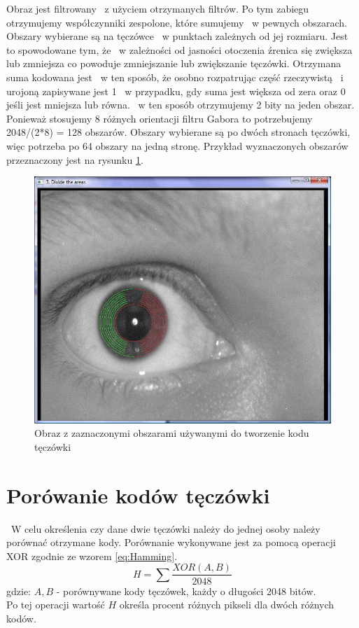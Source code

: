 Obraz jest filtrowany ~z użyciem otrzymanych filtrów. Po tym zabiegu otrzymujemy współczynniki zespolone, które sumujemy ~w pewnych obszarach. Obszary wybierane są na tęczówce ~w punktach zależnych od jej rozmiaru. Jest to spowodowane tym, że ~w zależności od jasności otoczenia źrenica się zwiększa lub zmniejsza co powoduje zmniejszanie lub zwiększanie tęczówki. Otrzymana suma kodowana jest ~w ten sposób, że osobno rozpatrując część rzeczywistą ~i urojoną zapisywane jest 1 ~w przypadku, gdy suma jest większa od zera oraz 0 jeśli jest mniejsza lub równa. ~w ten sposób otrzymujemy 2 bity na jeden obszar. Ponieważ stosujemy 8 różnych orientacji filtru Gabora to potrzebujemy 2048/(2*8) = 128 obszarów. Obszary wybierane są po dwóch stronach tęczówki, więc potrzeba po 64 obszary na jedną stronę. Przykład wyznaczonych obszarów przeznaczony jest na rysunku \ref{fig:obszaryNasze}.

\begin{figure}
\label{fig:obszaryNasze}
\begin{center}
\includegraphics[scale=0.5]{obszary.jpg}
\caption{Obraz z zaznaczonymi obszarami używanymi do tworzenie kodu tęczówki}
\end{center}
\end{figure}

\section{Porówanie kodów tęczówki}
\label{sec:porownanieKodow}
~W celu określenia czy dane dwie tęczówki należy do jednej osoby należy porównać otrzymane kody. Porównanie wykonywane jest za pomocą operacji XOR zgodnie ze wzorem \ref{eq:Hamming}.
\begin{equation}
\label{eq:Hamming}
H = \sum \frac{XOR(A,B)}{2048}
\end{equation}
gdzie:
$A, B$ - porównywane kody tęczówek, każdy o długości 2048 bitów.\\
Po tej operacji wartość $H$ określa procent różnych pikseli dla dwóch różnych kodów.


